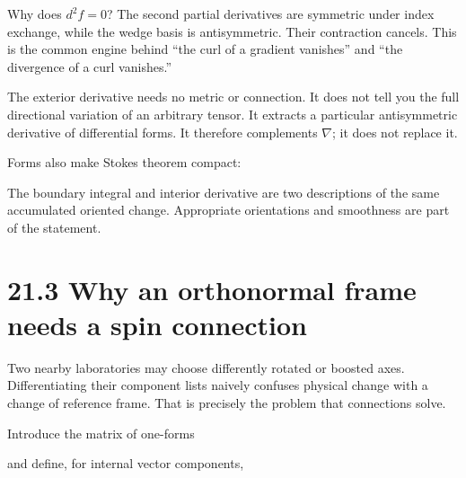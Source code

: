 \documentclass[
  11pt,
  letterpaper,
  oneside,
  openany]{scrbook}
\begin{document}
Why does \(d^2f=0\)? The second partial derivatives are symmetric under
index exchange, while the wedge basis is antisymmetric. Their
contraction cancels. This is the common engine behind ``the curl of a
gradient vanishes'' and ``the divergence of a curl vanishes.''

The exterior derivative needs no metric or connection. It does not tell
you the full directional variation of an arbitrary tensor. It extracts a
particular antisymmetric derivative of differential forms. It therefore
complements \(\nabla\); it does not replace it.

Forms also make Stokes\textquotesingle{} theorem compact:

\begin{center}
\begingroup
{}
\ifdim\wd\grmathbox>\linewidth
\resizebox{\linewidth}{!}{\usebox{\grmathbox}}
\else\usebox{\grmathbox}\fi
\endgroup
\end{center}

The boundary integral and interior derivative are two descriptions of
the same accumulated oriented change. Appropriate orientations and
smoothness are part of the statement.

\hypertarget{why-an-orthonormal-frame-needs-a-spin-connection}{%
\section{21.3 Why an orthonormal frame needs a spin
connection}\label{why-an-orthonormal-frame-needs-a-spin-connection}}

Two nearby laboratories may choose differently rotated or boosted axes.
Differentiating their component lists naively confuses physical change
with a change of reference frame. That is precisely the problem that
connections solve.

Introduce the matrix of one-forms

\begin{center}
\begingroup
{}
\ifdim\wd\grmathbox>\linewidth
\resizebox{\linewidth}{!}{\usebox{\grmathbox}}
\else\usebox{\grmathbox}\fi
\endgroup
\end{center}

and define, for internal vector components,

\begin{center}
\begingroup
{}
\ifdim\wd\grmathbox>\linewidth
\resizebox{\linewidth}{!}{\usebox{\grmathbox}}
\else\usebox{\grmathbox}\fi
\endgroup
\end{center}
\end{document}
